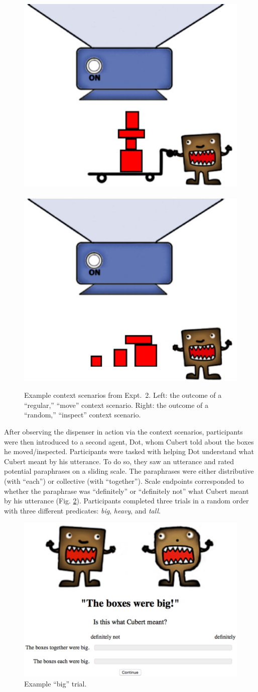 \documentclass[linguex]{sp}
\begin{document}
\begin{figure}[h]
\centering
\includegraphics[width=.45\textwidth]{images/context13reg.eps}
\ \ \ \ 
\includegraphics[width=.45\textwidth]{images/context13nodolly.eps}
\caption{Example context scenarios from Expt.~2. Left: the outcome of a ``regular,'' ``move'' context scenario. Right: the outcome of a ``random,'' ``inspect'' context scenario.\label{expt2context}}
\end{figure}


After observing the dispenser in action via the context  scenarios, participants were then introduced to a second agent, Dot, whom Cubert told about the boxes he moved/inspected. Participants were tasked with helping Dot understand what Cubert meant by his utterance. To do so, they saw an utterance and rated potential paraphrases on a sliding scale. The paraphrases were either distributive (with  ``each'') or collective (with ``together'').  Scale endpoints corresponded to whether the paraphrase was ``definitely'' or ``definitely not'' what Cubert meant by his utterance (Fig. \ref{trial}). Participants completed three trials in a random order with three different predicates: \emph{big}, \emph{heavy}, and \emph{tall}.


\begin{figure}[h]
\centering
\includegraphics[width=4.5in]{images/trial.eps}
\caption{Example ``big'' trial.}\label{trial}
\end{figure}
\end{document}
